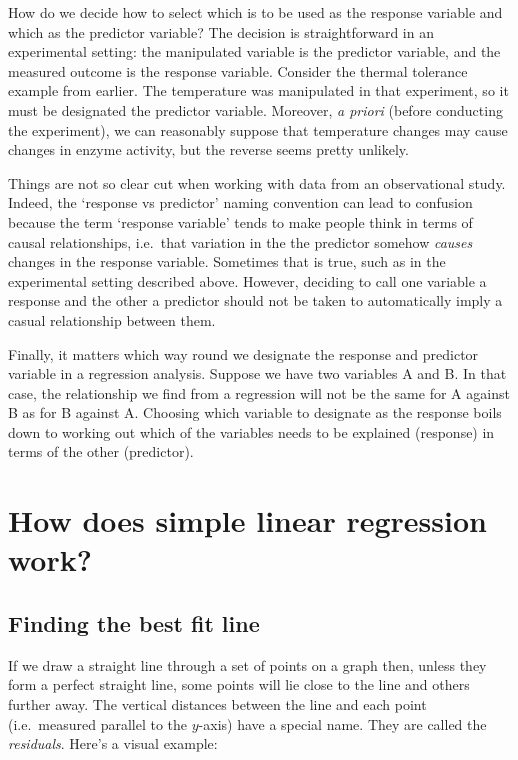 \documentclass[
]{book}
\begin{document}
How do we decide how to select which is to be used as the response variable and which as the predictor variable? The decision is straightforward in an experimental setting: the manipulated variable is the predictor variable, and the measured outcome is the response variable. Consider the thermal tolerance example from earlier. The temperature was manipulated in that experiment, so it must be designated the predictor variable. Moreover, \emph{a priori} (before conducting the experiment), we can reasonably suppose that temperature changes may cause changes in enzyme activity, but the reverse seems pretty unlikely.

Things are not so clear cut when working with data from an observational study. Indeed, the `response vs predictor' naming convention can lead to confusion because the term `response variable' tends to make people think in terms of causal relationships, i.e.~that variation in the the predictor somehow \emph{causes} changes in the response variable. Sometimes that is true, such as in the experimental setting described above. However, deciding to call one variable a response and the other a predictor should not be taken to automatically imply a casual relationship between them.

Finally, it matters which way round we designate the response and predictor variable in a regression analysis. Suppose we have two variables A and B. In that case, the relationship we find from a regression will not be the same for A against B as for B against A. Choosing which variable to designate as the response boils down to working out which of the variables needs to be explained (response) in terms of the other (predictor).

\hypertarget{how-does-simple-linear-regression-work}{%
\section{How does simple linear regression work?}\label{how-does-simple-linear-regression-work}}

\hypertarget{finding-the-best-fit-line}{%
\subsection{Finding the best fit line}\label{finding-the-best-fit-line}}

If we draw a straight line through a set of points on a graph then, unless they form a perfect straight line, some points will lie close to the line and others further away. The vertical distances between the line and each point (i.e.~measured parallel to the \(y\)-axis) have a special name. They are called the \emph{residuals}. Here's a visual example:
\end{document}
